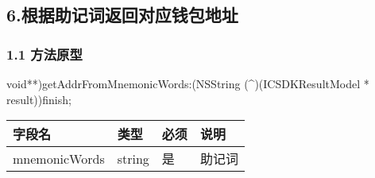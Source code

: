 \documentclass[letterpaper,10pt,english]{sphinxmanual}
\begin{document}
\begin{sphinxVerbatim}[commandchars=\\\{\}]
     
     
\end{sphinxVerbatim}


\begin{sphinxVerbatim}[commandchars=\\\{\}]
     
\end{sphinxVerbatim}


\subsection{6.根据助记词返回对应钱包地址}
\label{\detokenize{BCBWalletSDK_u63a5_u53e3_u8bf4_u660e:id101}}

\subsubsection{1.1 方法原型}
\label{\detokenize{BCBWalletSDK_u63a5_u53e3_u8bf4_u660e:id102}}
\sphinxstylestrong{-(}void**)getAddrFromMnemonicWords:(NSString (\textasciicircum{})(ICSDKResultModel * result))finish;



\begin{savenotes}\sphinxattablestart
\centering
\begin{tabulary}{\linewidth}[t]{|T|T|T|T|}
\hline
\sphinxstyletheadfamily 
字段名
&\sphinxstyletheadfamily 
类型
&\sphinxstyletheadfamily 
必须
&\sphinxstyletheadfamily 
说明
\\
\hline
mnemonicWords
&
string
&
是
&
助记词
\\
\hline
\end{tabulary}
\par
\sphinxattableend\end{savenotes}
\end{document}
